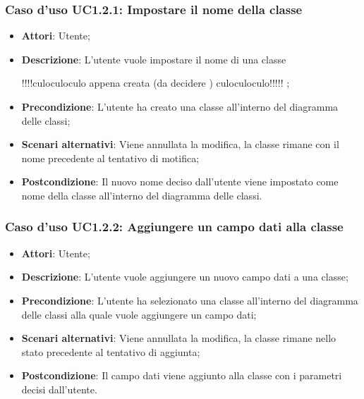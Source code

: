 \documentclass[a4paper]{report}
\begin{document}
\subsubsection{Caso d'uso UC1.2.1: Impostare il nome della classe}
\begin{itemize}
	\item \textbf{Attori}: Utente;
	
	\item \textbf{Descrizione}: L'utente vuole impostare il nome di una classe 
	
	!!!!culoculoculo appena creata (da decidere ) culoculoculo!!!!! ;
	
	\item \textbf{Precondizione}: L'utente ha creato una classe all'interno del diagramma delle classi;
	
	\item \textbf{Scenari alternativi}: Viene annullata la modifica, la classe
	rimane con il nome precedente al tentativo di motifica;
	
	\item \textbf{Postcondizione}: Il nuovo nome deciso dall'utente viene impostato come nome della classe all'interno del diagramma delle classi.
\end{itemize}

\subsubsection{Caso d'uso UC1.2.2: Aggiungere un campo dati alla classe}
\begin{itemize}
	\item \textbf{Attori}: Utente;

	\item \textbf{Descrizione}: L'utente vuole aggiungere un nuovo campo dati a una classe;
	
	\item \textbf{Precondizione}: L'utente ha selezionato una classe all'interno del diagramma delle classi alla quale vuole aggiungere un campo dati;
	
	\item \textbf{Scenari alternativi}: Viene annullata la modifica, la classe
	rimane nello stato precedente al tentativo di aggiunta;
	
	\item \textbf{Postcondizione}: Il campo dati viene aggiunto alla classe con i parametri decisi dall'utente.
\end{itemize}
\end{document}
